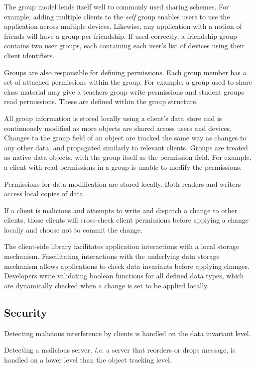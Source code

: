 The group model lends itself well to commonly used sharing schemes. For example, adding multiple clients to the \textit{self} group enables users to use the application across multiple devices. Likewise, any application with a notion of friends will have a group per friendship. If used correctly, a friendship group contains two user groups, each containing each user's list of devices using their client identifiers.

Groups are also responsible for defining permissions. Each group member has a set of attached permissions within the group. For example, a group used to share class material may give a teachers group write permissions and student groups read permissions. These are defined within the group structure.

All group information is stored locally using a client's data store and is continuously modified as more objects are shared across users and devices.
Changes to the group field of an object are tracked the same way as changes to any other data, and propagated similarly to relevant clients. Groups are treated as \name{} native data objects, with the group itself as the permission field. For example, a client with read permissions in a group is unable to modify the permissions. 

Permissions for data modification are stored locally. Both readers and writers access local copies of data. 

If a client is malicious and attempts to write and dispatch a change to other clients, those clients will cross-check client permissions before applying a change locally and choose not to commit the change.


The \name{} client-side library facilitates application interactions with a local storage mechanism. Fascilitating interactions with the underlying data storage mechanism allows \name{} applications to check data invariants before applying changes. Developers write validating boolean functions for all defined data types, which are dynamically checked when a change is set to be applied locally. 

\subsection{Security}
Detecting malicious interference by clients is handled on the data invariant level.

Detecting a malicious server, \textit{i.e.} a server that reorders or drops message, is handled on a lower level than the object tracking level. 